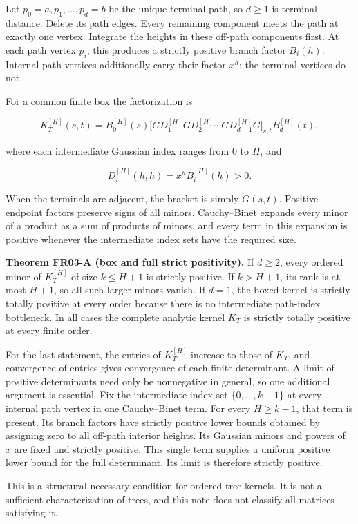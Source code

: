 \documentclass[
  11pt,
  a4paper,
]{report}
\begin{document}
Let \(p_0=a,p_1,\ldots,p_d=b\) be the unique terminal path, so \(d\ge1\)
is terminal distance. Delete its path edges. Every remaining component
meets the path at exactly one vertex. Integrate the heights in these
off-path components first. At each path vertex \(p_i\), this produces a
strictly positive branch factor \(B_i(h)\). Internal path vertices
additionally carry their factor \(x^h\); the terminal vertices do not.

For a common finite box the factorization is

\[
K_T^{[H]}(s,t)=B_0^{[H]}(s)
\bigl[G D_1^{[H]}G D_2^{[H]}\cdots
G D_{d-1}^{[H]}G\bigr]_{s,t}
B_d^{[H]}(t),
\]

where each intermediate Gaussian index ranges from \(0\) to \(H\), and

\[
D_i^{[H]}(h,h)=x^h B_i^{[H]}(h)>0.
\]

When the terminals are adjacent, the bracket is simply \(G(s,t)\).
Positive endpoint factors preserve signs of all minors. Cauchy--Binet
expands every minor of a product as a sum of products of minors, and
every term in this expansion is positive whenever the intermediate index
sets have the required size.

\textbf{Theorem FR03-A (box and full strict positivity).} If \(d\ge2\),
every ordered minor of \(K_T^{[H]}\) of size \(k\le H+1\) is strictly
positive. If \(k>H+1\), its rank is at most \(H+1\), so all such larger
minors vanish. If \(d=1\), the boxed kernel is strictly totally positive
at every order because there is no intermediate path-index bottleneck.
In all cases the complete analytic kernel \(K_T\) is strictly totally
positive at every finite order.

For the last statement, the entries of \(K_T^{[H]}\) increase to those
of \(K_T\), and convergence of entries gives convergence of each finite
determinant. A limit of positive determinants need only be nonnegative
in general, so one additional argument is essential. Fix the
intermediate index set \(\{0,\ldots,k-1\}\) at every internal path
vertex in one Cauchy--Binet term. For every \(H\ge k-1\), that term is
present. Its branch factors have strictly positive lower bounds obtained
by assigning zero to all off-path interior heights. Its Gaussian minors
and powers of \(x\) are fixed and strictly positive. This single term
supplies a uniform positive lower bound for the full determinant. Its
limit is therefore strictly positive.

This is a structural necessary condition for ordered tree kernels. It is
not a sufficient characterization of trees, and this note does not
classify all matrices satisfying it.
\end{document}
